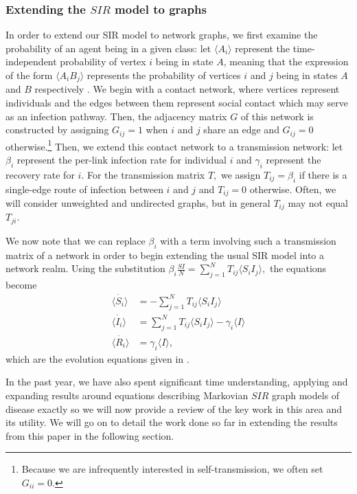 \documentclass[../report.tex]{subfiles}
\begin{document}
\subsubsection{Extending the $SIR$ model to graphs}

In order to extend our SIR model to network graphs, we first examine the probability of an agent being in a given class: let $\langle A_i \rangle$ represent the time-independent probability of vertex $i$ being in state $A$, meaning that the expression of the form $\langle A_i B_j \rangle$ represents the probability of vertices $i$ and $j$ being in states $A$ and $B$ respectively \cite{kiss_2014}. We begin with a contact network, where vertices represent individuals and the edges between them represent social contact which may serve as an infection pathway. Then, the adjacency matrix $G$ of this network is constructed by assigning $G_{ij} = 1$ when $i$ and $j$ share an edge and $G_{ij} = 0$ otherwise.\footnote{Because we are infrequently interested in self-transmission, we often set $G_{ii}=0.$} Then, we extend this contact network to a transmission network: let $\beta_i$ represent the per-link infection rate for individual $i$ and $\gamma_i$ represent the recovery rate for $i$. For the transmission matrix $T,$ we assign $T_{ij}=\beta_i$ if there is a single-edge route of infection between $i$ and $j$ and $T_{ij}=0$ otherwise. Often, we will consider unweighted and undirected graphs, but in general $T_{ij}$ may not equal $T_{ji}$.

We now note that we can replace $\beta_i$ with a term involving such a transmission matrix of a network in order to begin extending the usual SIR model into a network realm. Using the substitution $ \beta_i \frac{SI}{N} = \sum^{N}_{j=1}T_{ij} \langle S_i I_j \rangle,$ the equations become
\begin{align*}
\dot{\langle S_i \rangle} & = -\sum^{N}_{j=1}T_{ij} \langle S_i I_j \rangle\\
\dot{\langle I_i \rangle} & =\sum^{N}_{j=1}T_{ij}\langle S_i I_j \rangle - \gamma_i \langle I \rangle \\
\dot{\langle R_i \rangle} & = \gamma_i \langle I \rangle,
\end{align*}
which are the evolution equations given in \cite{kiss_2014}.

In the past year, we have also spent significant time understanding, applying and expanding results around equations describing Markovian $SIR$ graph models of disease exactly \cite{kiss_2014} so we will now provide a review of the key work in this area and its utility. We will go on to detail the work done so far in extending the results from this paper in the following section.
\end{document}

